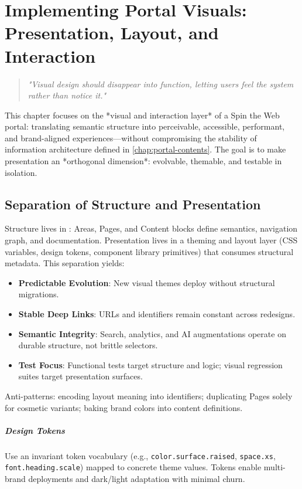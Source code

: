 \chapter{Implementing Portal Visuals: Presentation, Layout, and Interaction}
\label{chap:portal-visuals}

\begin{quote}
\textit{"Visual design should disappear into function, letting users feel the system rather than notice it."}
\end{quote}

This chapter focuses on the *visual and interaction layer* of a Spin the Web portal: translating semantic structure into perceivable, accessible, performant, and brand-aligned experiences—without compromising the stability of information architecture defined in \cref{chap:portal-contents}. The goal is to make presentation an *orthogonal dimension*: evolvable, themable, and testable in isolation.

\section{Separation of Structure and Presentation}
Structure lives in \wbol{}: Areas, Pages, and Content blocks define semantics, navigation graph, and documentation. Presentation lives in a theming and layout layer (CSS variables, design tokens, component library primitives) that consumes structural metadata. This separation yields:
\begin{itemize}
	\item \textbf{Predictable Evolution}: New visual themes deploy without structural migrations.
	\item \textbf{Stable Deep Links}: URLs and identifiers remain constant across redesigns.
	\item \textbf{Semantic Integrity}: Search, analytics, and AI augmentations operate on durable structure, not brittle selectors.
	\item \textbf{Test Focus}: Functional tests target structure and logic; visual regression suites target presentation surfaces.
\end{itemize}
Anti-patterns: encoding layout meaning into identifiers; duplicating Pages solely for cosmetic variants; baking brand colors into content definitions.

\paragraph{Design Tokens} Use an invariant token vocabulary (e.g., \texttt{color.surface.raised}, \texttt{space.xs}, \texttt{font.heading.scale}) mapped to concrete theme values. Tokens enable multi-brand deployments and dark/light adaptation with minimal churn.

